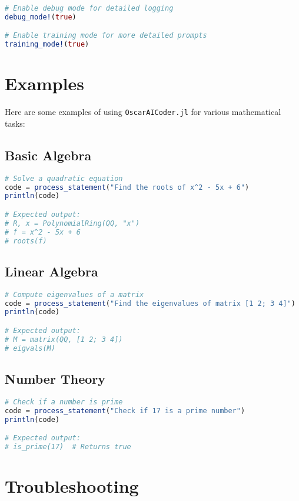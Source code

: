 \documentclass[11pt,a4paper]{article}
\newcommand{\modname}[1]{\texttt{#1}}
\begin{document}
\begin{lstlisting}[language=Julia]
# Enable debug mode for detailed logging
debug_mode!(true)

# Enable training mode for more detailed prompts
training_mode!(true)
\end{lstlisting}

\section{Examples}
\label{sec:examples}

Here are some examples of using \modname{OscarAICoder.jl} for various mathematical tasks:

\subsection{Basic Algebra}

\begin{lstlisting}[language=Julia]
# Solve a quadratic equation
code = process_statement("Find the roots of x^2 - 5x + 6")
println(code)

# Expected output:
# R, x = PolynomialRing(QQ, "x")
# f = x^2 - 5x + 6
# roots(f)
\end{lstlisting}

\subsection{Linear Algebra}

\begin{lstlisting}[language=Julia]
# Compute eigenvalues of a matrix
code = process_statement("Find the eigenvalues of matrix [1 2; 3 4]")
println(code)

# Expected output:
# M = matrix(QQ, [1 2; 3 4])
# eigvals(M)
\end{lstlisting}

\subsection{Number Theory}

\begin{lstlisting}[language=Julia]
# Check if a number is prime
code = process_statement("Check if 17 is a prime number")
println(code)

# Expected output:
# is_prime(17)  # Returns true
\end{lstlisting}

\section{Troubleshooting}
\label{sec:troubleshooting}
\end{document}
